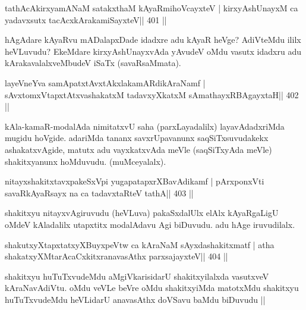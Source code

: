 
\begin{shl}
tathAcAkirxyamANaM satakxthaM kAyaRmihoVcayxteV |
kirxyAshUnayxM ca yadavxsutx tacAcxkArakamiSayxteV\hfill || 401 ||
\end{shl}

\begin{artha}
hAgAdare kAyaRvu mADalapxDade idadxre adu kAyaR heVge? AdiVteMdu ililx heVLuvudu? EkeMdare kirxyAshUnayxvAda yAvudeV oMdu vasutx idadxru adu kArakavalalxveMbudeV iSaTx (savaRsaMmata).
\end{artha}


\begin{shl}
layeVneYva samApatxtAvxtAkxlakamARdikAraNamf |
sAvxtomxVtapxtAtxvashakatxM tadavxyXkatxM sAmathayxRBAgayxtaH\hfill || 402 ||
\end{shl}

\begin{artha}
kAla-kamaR-modalAda nimitatxvU saha (parxLayadalilx) layavAdadxriMda  mugidu hoVgide. adariMda tananx savxrUpavanunx saqSiTxsuvudakekx ashakatxvAgide, matutx adu vayxkatxvAda meVle (saqSiTxyAda meVle) shakitxyanunx hoMduvudu. (muMceyalalx).
\end{artha}

\begin{shl}
nitayxshakitxtavxpakeSxV\s pi yugapatapxrXBavAdikamf |
pArxponxVti savaRkAyaRsayx na ca tadavxtaRteV tathA\hfill || 403 ||
\end{shl}

\begin{artha}
shakitxyu nitayxvAgiruvudu (heVLuva) pakaSxdalUlx elAlx kAyaRgaLigU  oMdeV kAladalilx utapxtitx modalAdavu Agi biDuvudu. adu hAge iruvudilalx.
\end{artha}

\begin{shl}
shakutxyXtapxtatxyXBuyxpeVtw ca kAraNaM sAyxdashakitxmatf |
atha shakatxyXMtarAcaCxkitxranavasAthx parxsajayxteV\hfill || 404 ||
\end{shl}

\begin{artha}
shakitxyu huTuTxvudeMdu aMgiVkarisidarU shakitxyilalxda vasutxveV 
kAraNa\-vAdiVtu. oMdu veVLe beVre oMdu shakitxyiMda matotxMdu shakitxyu 
huTuTxvudeMdu heVLidarU anavasAthx doVSavu baMdu biDuvudu || 
\end{artha}

